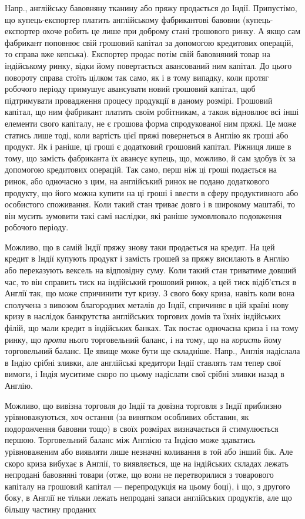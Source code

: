
Напр., англійську бавовняну тканину або пряжу продається до Індії.
Припустімо, що купець-експортер платить англійському фабрикантові
бавовни (купець-експортер охоче робить це лише при доброму стані грошового
ринку. А якщо сам фабрикант поповнює свій грошовий капітал
за допомогою кредитових операцій, то справа вже кепська). Експортер
продає потім свій бавовняний товар на індійському ринку, відки йому
повертається авансований ним капітал. До цього повороту справа стоїть
цілком так само, як і в тому випадку, коли протяг робочого періоду
примушує авансувати новий грошовий капітал, щоб підтримувати провадження
процесу продукції в даному розмірі. Грошовий капітал, що ним
фабрикант платить своїм робітникам, а також відновлює всі інші елементи
свого капіталу, не є грошова форма спродукованої ним пряжі.
Це може статись лише тоді, коли вартість цієї пряжі повернеться в Англію
як гроші або продукт. Як і раніше, ці гроші є додатковий грошовий
капітал. Ріжниця лише в тому, що замість фабриканта їх авансує
купець, що, можливо, й сам здобув їх за допомогою кредитових операцій.
Так само, перш ніж ці гроші подається на ринок, або одночасно з цим,
на англійський ринок не подано додаткового продукту, що його можна
купити на ці гроші і ввести в сферу продуктивного або особистого споживання.
Коли такий стан триває довго і в широкому маштабі, то він
мусить зумовити такі самі наслідки, які раніше зумовлювало подовження
робочого періоду.

Можливо, що в самій Індії пряжу знову таки продається на кредит.
На цей кредит в Індії купують продукт і замість грошей за пряжу висилають
в Англію або переказують вексель на відповідну суму. Коли такий
стан триватиме довший час, то він справить тиск на індійський грошовий
ринок, а цей тиск відіб’ється в Англії так, що може спричинити
тут кризу. З свого боку криза, навіть коли вона сполучена з вивозом
благородних металів до Індії, спричиняє в цій країні нову кризу в наслідок
банкрутства англійських торгових домів та їхніх індійських філій,
що мали кредит в індійських банках. Так постає одночасна криза і на
тому ринку, що \emph{проти} нього торговельний баланс, і на тому, що на
\emph{користь} йому торговельний баланс. Це явище може бути ще складніше.
Напр., Англія надіслала в Індію срібні зливки, але англійські
кредитори Індії ставлять там тепер свої вимоги, і Індія муситиме скоро
по цьому надіслати свої срібні зливки назад в Англію.

Можливо, що вивізна торговля до Індії та довізна торговля з Індії
приблизно урівноважуються, хоч остання (за винятком особливих обставин,
як подорожчення бавовни тощо) в своїх розмірах визначається й
стимулюється першою. Торговельний баланс між Англією та Індією може
здаватись урівноваженим або виявляти лише незначні коливання в той
або інший бік. Але скоро криза вибухає в Англії, то виявляється, ще
на індійських складах лежать непродані бавовняні товари (отже, що вони
не перетворилися з товарового капіталу на грошовий капітал — перепродукція
на цьому боці), і що, з другого боку, в Англії не тільки лежать
непродані запаси англійських продуктів, але що більшу частину проданих
\parbreak{}  %
